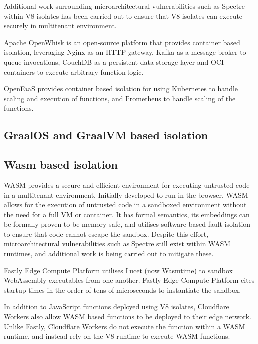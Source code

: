 Additional work surrounding microarchitectural vulnerabilities such as Spectre within V8 isolates has been carried out to ensure that V8 isolates can execute securely in multitenant environment\cite{schwarzlRobustScalableProcess2022}.

Apache OpenWhisk\cite{apacheOpenWhisk2024} is an open-source \faas{} platform that provides container based isolation, leveraging Nginx as an HTTP gateway, Kafka as a message broker to queue invocations, CouchDB as a persistent data storage layer and OCI containers to execute arbitrary function logic.

OpenFaaS\cite{ellisOpenFaaS2024} provides container based isolation for \faas{} using Kubernetes to handle scaling and execution of functions, and Prometheus to handle scaling of the functions.

\subsection{GraalOS and GraalVM based isolation}

\subsection{Wasm based isolation}
WASM provides a secure and efficient environment for executing untrusted code\cite{WebAssembly} in a multitenant environment. Initially developed to run in the browser, WASM allows for the execution of untrusted code in a sandboxed environment without the need for a full VM or container. It has formal semantics\cite{haasBringingWebSpeed2017}, its embeddings can be formally proven to be memory-safe\cite{SecurefoundationsVWasm2024}, and utilises software based fault isolation to ensure that code cannot escape the sandbox\cite{SecurityWebAssembly}. Despite this effort, microarchitectural vulnerabilities such as Spectre still exist within WASM runtimes, and additional work is being carried out to mitigate these\cite{narayanSwivelHardeningWebAssembly2021}.

Fastly Edge Compute Platform\cite{EdgeCloudPlatform} utilises Lucet\cite{BytecodeallianceLucet2024} (now Wasmtime\cite{Wasmtime}) to sandbox WebAssembly executables from one-another. Fastly Edge Compute Platform cites startup times in the order of tens of microseconds to instantiate the sandbox.

In addition to JavaScript functions deployed using V8 isolates, Cloudflare Workers\cite{CloudComputingContainers2018} also allow WASM based functions to be deployed to their edge network. Unlike Fastly, Cloudflare Workers do not execute the function within a WASM runtime, and instead rely on the V8 runtime to execute WASM functions\cite{WebAssemblyWasmCloudflare2024}.

